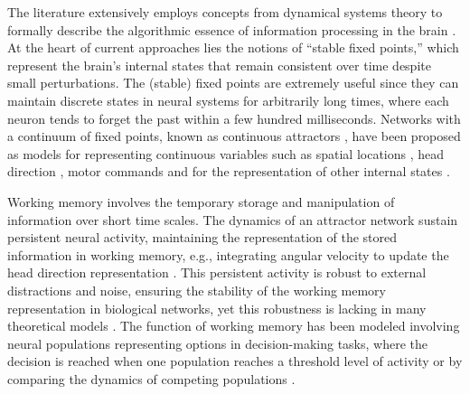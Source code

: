 \documentclass[12pt,letterpaper, onecolumn]{article}
\theoremstyle{definition}
\theoremstyle{remark}
\begin{document}
The literature extensively employs concepts from dynamical systems theory to formally describe the algorithmic essence of information processing in the brain \citep{vyas2020computation}.
At the heart of current approaches lies the notions of ``stable fixed points,'' which represent the brain's internal states that remain consistent over time despite small perturbations.
The (stable) fixed points are extremely useful since they can maintain discrete states in neural systems for arbitrarily long times, where each neuron tends to forget the past within a few hundred milliseconds.
Networks with a continuum of fixed points, known as continuous attractors \citep{fung2010, khona2022, wu2008, wu2016}, have been proposed as models for representing continuous variables such as spatial locations \citep{samsonovich1997, stringer2002placecells, yang2022, wimmer2014}, head direction \citep{stringer2002headdirection, hulse2020, turner2017, turner2020neuroanatomical, vafidis2022, kim2019generation}, motor commands \citep{stringer2003} and for the representation of other internal states \citep{nair2023, branco2016}.

%

Working memory involves the temporary storage and manipulation of information over short time scales. The dynamics of an attractor network sustain persistent neural activity, maintaining the representation of the stored information in working memory, e.g., integrating angular velocity to update the head direction representation \citep{barak2014, durstewitz2000, wolpert1995, goncalves2014, burak2009, goldman2007, aksay2007, noorman2022, cueva2021a, cueva2021b}. This persistent activity is robust to external distractions and noise, ensuring the stability of the working memory representation \citep{panichello2019, koulakov2002} in biological networks, yet this robustness is lacking in many theoretical models \citep{renart2003, seeholzer2019}.
The function of working memory has been modeled involving neural populations representing options in decision-making tasks, where the decision is reached when one population reaches a threshold level of activity or by comparing the dynamics of competing populations \citep{wong2007, wong2008, hocker2024}.
\end{document}
